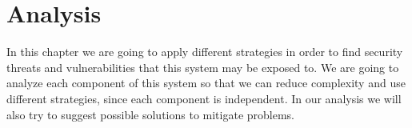 \section{Analysis}

In this chapter we are going to apply different strategies in order to find security threats and vulnerabilities that this system may be exposed to. We are going to analyze each component of this system so that we can reduce complexity and use different strategies, since each component is independent. In our analysis we will also try to suggest possible solutions to mitigate problems.





